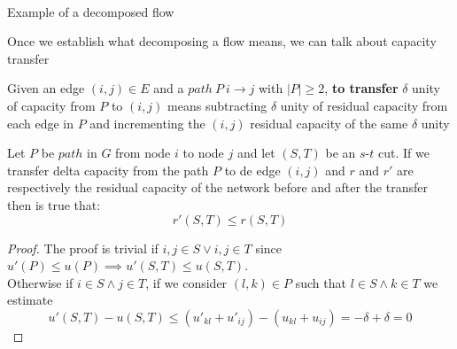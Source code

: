 \begin{center}
     \\
Example of a decomposed flow 
\end{center}

Once we establish what decomposing a flow means, we can talk about capacity transfer
\begin{definition}[Tranfer]
    Given an edge $(i,j) \in E$ and a $path\ P\ i\rightarrow j$ with $|P|\ge 2$, \textbf{to transfer} $\delta$ unity of capacity from $P$ to $(i,j)$ means subtracting $\delta$ unity of residual capacity from each edge in $P$ and incrementing the $(i,j)$ residual capacity of the same $\delta$ unity
\end{definition}
\begin{lemma}
    Let $P$ be $path$ in $G$ from node $i$ to node $j$ and let $(S,T)$ be an $s$-$t$ cut. 
    If we transfer delta capacity from the path $P$ to de edge $(i, j)$ and $r$ and $r'$ are respectively the residual capacity of the network before and after the transfer then is true that:
    \[r'(S,T) \le r(S,T)\] 
\end{lemma}
\begin{proof}
    The proof is trivial if $i,j \in S \lor i,j \in T$ since $u'(P) \le u(P) \implies u'(S,T)\le u(S,T)$.\\
    Otherwise if $i\in S \land j \in T$, if we consider $(l,k)\in P$ such that $l \in S\land k\in T$ we estimate
    \[u'(S,T)-u(S,T)\le (u'_{kl}+u'_{ij})- (u_{kl}+u_{ij}) = -\delta + \delta = 0\]
\end{proof}


